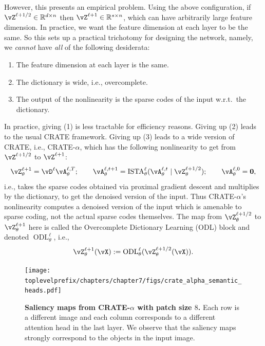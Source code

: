 \documentclass[../../book-main.tex]{subfiles}
\begin{document}
However, this presents an empirical problem. Using the above configuration, if \(\vZ^{\ell + 1/2} \in \R^{d \times n}\) then \(\vZ^{\ell + 1} \in \R^{s \times n}\), which can have arbitrarily large feature dimension. In practice, we want the feature dimension at each layer to be the same. So this sets up a practical trichotomy for designing the network, namely, we \textit{cannot} have \textit{all} of the following desiderata:
\begin{enumerate}
    \item The feature dimension at each layer is the same.
    \item The dictionary is wide, i.e., overcomplete.
    \item The output of the nonlinearity is the sparse codes of the input w.r.t.~the dictionary.
\end{enumerate}
In practice, giving (1) is less tractable for efficiency reasons. Giving up (2) leads to the usual CRATE framework. Giving up (3) leads to a wide version of CRATE, i.e., CRATE-\(\alpha\), which has the following nonlinearity to get from \(\vZ^{\ell + 1/2}\) to \(\vZ^{\ell + 1}\):
\begin{equation}
    \vZ_{\theta}^{\ell + 1} = \vD^{\ell}\vA_{\theta}^{\ell, T}; \qquad \vA_{\theta}^{\ell, t + 1} = \ISTA_{\theta}^{\ell}(\vA_{\theta}^{\ell, t} \mid \vZ_{\theta}^{\ell + 1/2}); \qquad \vA_{\theta}^{\ell, 0} = \vzero,
\end{equation}
i.e., takes the sparse codes obtained via proximal gradient descent and multiplies by the dictionary, to get the denoised version of the input. Thus CRATE-\(\alpha\)'s nonlinearity computes a denoised version of the input which is amenable to sparse coding, not the actual sparse codes themselves. The map from \(\vZ_{\theta}^{\ell + 1/2}\) to \(\vZ_{\theta}^{\ell + 1}\) here is called the Overcomplete Dictionary Learning (ODL) block and denoted \(\operatorname{ODL}_{\theta}^{\ell}\), i.e.,
\begin{equation}
    \vZ_{\theta}^{\ell + 1}(\vX) := \operatorname{ODL}_{\theta}^{\ell}(\vZ_{\theta}^{\ell + 1/2}(\vX)).
\end{equation}



\begin{figure}[t]
    \centering 
    \texttt{[image: \\toplevelprefix/chapters/chapter7/figs/crate\_alpha\_semantic\_heads.pdf]}
    \caption{\small\textbf{Saliency maps from CRATE-\(\alpha\) with patch size \(8\).} Each row is a different image and each column corresponds to a different attention head in the last layer. We observe that the saliency maps strongly correspond to the objects in the input image.}
    \label{fig:crate_alpha_saliency_maps}
\end{figure}
\end{document}
